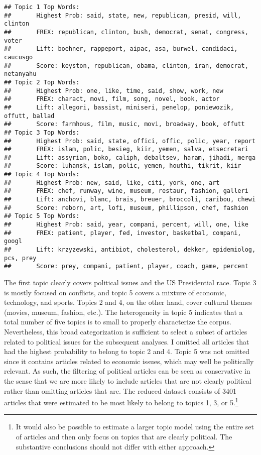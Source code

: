 \documentclass[12pt]{article}
\begin{document}
\begin{doublespace}
\begin{knitrout}
\color{fgcolor}\begin{kframe}
\begin{verbatim}
## Topic 1 Top Words:
##  	 Highest Prob: said, state, new, republican, presid, will, clinton 
##  	 FREX: republican, clinton, bush, democrat, senat, congress, voter 
##  	 Lift: boehner, rappeport, aipac, asa, burwel, candidaci, caucusgo 
##  	 Score: keyston, republican, obama, clinton, iran, democrat, netanyahu 
## Topic 2 Top Words:
##  	 Highest Prob: one, like, time, said, show, work, new 
##  	 FREX: charact, movi, film, song, novel, book, actor 
##  	 Lift: allegori, bassist, miniseri, penelop, poniewozik, offutt, ballad 
##  	 Score: farmhous, film, music, movi, broadway, book, offutt 
## Topic 3 Top Words:
##  	 Highest Prob: said, state, offici, offic, polic, year, report 
##  	 FREX: islam, polic, besieg, kiir, yemen, salva, etsecretari 
##  	 Lift: assyrian, boko, caliph, debaltsev, haram, jihadi, merga 
##  	 Score: luhansk, islam, polic, yemen, houthi, tikrit, kiir 
## Topic 4 Top Words:
##  	 Highest Prob: new, said, like, citi, york, one, art 
##  	 FREX: chef, runway, wine, museum, restaur, fashion, galleri 
##  	 Lift: anchovi, blanc, brais, breuer, broccoli, caribou, chewi 
##  	 Score: reborn, art, lofi, museum, phillipson, chef, fashion 
## Topic 5 Top Words:
##  	 Highest Prob: said, year, compani, percent, will, one, like 
##  	 FREX: patient, player, fed, investor, basketbal, compani, googl 
##  	 Lift: krzyzewski, antibiot, cholesterol, dekker, epidemiolog, pcs, prey 
##  	 Score: prey, compani, patient, player, coach, game, percent
\end{verbatim}
\end{kframe}
\end{knitrout}

The first topic clearly covers political issues and the US Presidential race. Topic 3 is mostly focused on conflicts, and topic 5 covers a mixture of economic, technology, and sports. Topics 2 and 4, on the other hand, cover cultural themes (movies, museum, fashion, etc.). The heterogeneity in topic 5 indicates that a total number of five topics is to small to properly characterize the corpus. Nevertheless, this broad categorization is sufficient to select a subset of articles related to political issues for the subsequent analyses. I omitted all articles that had the highest probability to belong to topic 2 and 4. Topic 5 was not omitted since it contains articles related to economic issues, which may well be politically relevant. As such, the filtering of political articles can be seen as conservative in the sense that we are more likely to include articles that are not clearly political rather than omitting articles that are. The reduced dataset consists of 3401 articles that were estimated to be most likely to belong to topics 1, 3, or 5.\footnote{It would also be possible to estimate a larger topic model using the entire set of articles and then only focus on topics that are clearly political. The substantive conclusions should not differ with either approach.}



\end{doublespace}
\end{document}
